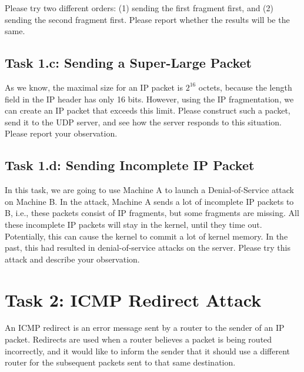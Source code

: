 Please try two different orders: (1) sending the first fragment first, and 
(2) sending the second fragment first. Please report whether the results will
be the same. 





\subsection{Task 1.c: Sending a Super-Large Packet}

As we know, the maximal size for an IP packet is $2^{16}$ octets, because
the length field in the IP header has only 16 bits. 
However,
using the IP fragmentation, we can create an IP packet that 
exceeds this limit. Please construct such a packet, send
it to the UDP server, and see how the server responds to this 
situation. Please report your observation. 
  



\subsection{Task 1.d: Sending Incomplete IP Packet}


In this task, we are going to use Machine A to launch a Denial-of-Service attack 
on Machine B. In the attack, Machine A sends  a lot of 
incomplete IP packets to B, i.e., these packets consist of 
IP fragments, but some fragments are missing. All these incomplete IP packets 
will stay in the kernel, until they time out. Potentially, this can
cause the kernel to commit a lot of kernel memory. In the past, this 
had resulted in denial-of-service attacks on the server. Please try 
this attack and describe your observation. 




\section{Task 2: ICMP Redirect Attack}

An ICMP redirect is an error message sent by a router to the sender of an
IP packet. Redirects are used when a router believes a packet is being
routed incorrectly, and it would like to inform the sender that it should
use a different router for the subsequent packets sent to that same
destination.


